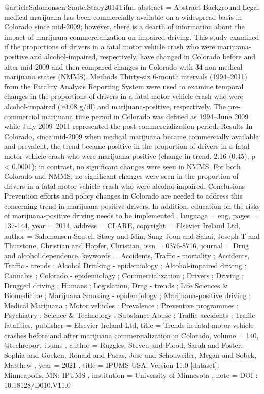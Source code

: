 @article{Salomonsen-SautelStacy2014Tifm,
abstract = {Abstract Background Legal medical marijuana has been commercially available on a widespread basis in Colorado since mid-2009; however, there is a dearth of information about the impact of marijuana commercialization on impaired driving. This study examined if the proportions of drivers in a fatal motor vehicle crash who were marijuana-positive and alcohol-impaired, respectively, have changed in Colorado before and after mid-2009 and then compared changes in Colorado with 34 non-medical marijuana states (NMMS). Methods Thirty-six 6-month intervals (1994–2011) from the Fatality Analysis Reporting System were used to examine temporal changes in the proportions of drivers in a fatal motor vehicle crash who were alcohol-impaired (≥0.08 g/dl) and marijuana-positive, respectively. The pre-commercial marijuana time period in Colorado was defined as 1994–June 2009 while July 2009–2011 represented the post-commercialization period. Results In Colorado, since mid-2009 when medical marijuana became commercially available and prevalent, the trend became positive in the proportion of drivers in a fatal motor vehicle crash who were marijuana-positive (change in trend, 2.16 (0.45), p < 0.0001); in contrast, no significant changes were seen in NMMS. For both Colorado and NMMS, no significant changes were seen in the proportion of drivers in a fatal motor vehicle crash who were alcohol-impaired. Conclusions Prevention efforts and policy changes in Colorado are needed to address this concerning trend in marijuana-positive drivers. In addition, education on the risks of marijuana-positive driving needs to be implemented.},
language = {eng},
pages = {137-144},
year = {2014},
address = {CLARE},
copyright = {Elsevier Ireland Ltd},
author = {Salomonsen-Sautel, Stacy and Min, Sung-Joon and Sakai, Joseph T and Thurstone, Christian and Hopfer, Christian},
issn = {0376-8716},
journal = {Drug and alcohol dependence},
keywords = {Accidents, Traffic - mortality ; Accidents, Traffic - trends ; Alcohol Drinking - epidemiology ; Alcohol-impaired driving ; Cannabis ; Colorado - epidemiology ; Commercialization ; Drivers ; Driving ; Drugged driving ; Humans ; Legislation, Drug - trends ; Life Sciences & Biomedicine ; Marijuana Smoking - epidemiology ; Marijuana-positive driving ; Medical Marijuana ; Motor vehicles ; Prevalence ; Preventive programmes ; Psychiatry ; Science & Technology ; Substance Abuse ; Traffic accidents ; Traffic fatalities},
publisher = {Elsevier Ireland Ltd},
title = {Trends in fatal motor vehicle crashes before and after marijuana commercialization in Colorado},
volume = {140},
}
@techreport { ipums ,
author = {Ruggles, Steven and Flood, Sarah and Foster, Sophia and Goeken, Ronald and Pacas, Jose and Schouweiler, Megan  and Sobek, Matthew  },
year = {2021} ,
title = {IPUMS USA: Version 11.0 [dataset]. Minneapolis, MN: IPUMS} ,
institution = {University of Minnesota} ,
note = { DOI : 10.18128/D010.V11.0} 
}